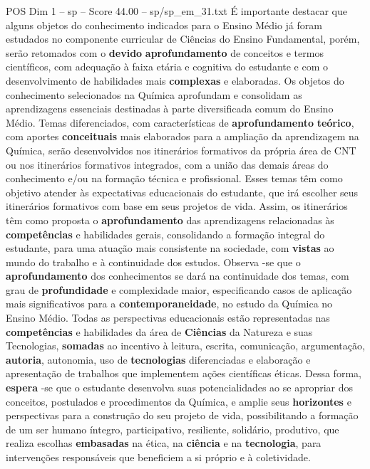 \begin{textsample}{POS Dim 1 – sp – Score 44.00 – sp/sp\_em\_31.txt}
É importante destacar que alguns objetos do conhecimento indicados para o Ensino Médio já foram estudados no componente curricular de Ciências do Ensino Fundamental, porém, serão retomados com o \textbf{devido} \textbf{aprofundamento} de conceitos e termos científicos, com adequação à faixa etária e cognitiva do estudante e com o desenvolvimento de habilidades mais \textbf{complexas} e elaboradas.
Os objetos do conhecimento selecionados na Química aprofundam e consolidam as aprendizagens essenciais destinadas à parte diversificada comum do Ensino Médio.
Temas diferenciados, com características de \textbf{aprofundamento} \textbf{teórico}, com aportes \textbf{conceituais} mais elaborados para a ampliação da aprendizagem na Química, serão desenvolvidos nos itinerários formativos da própria área de CNT ou nos itinerários formativos integrados, com a união das demais áreas do conhecimento e/ou na formação técnica e profissional.
Esses temas têm como objetivo atender às expectativas educacionais do estudante, que irá escolher seus itinerários formativos com base em seus projetos de vida.
Assim, os itinerários têm como proposta o \textbf{aprofundamento} das aprendizagens relacionadas às \textbf{competências} e habilidades gerais, consolidando a formação integral do estudante, para uma atuação mais consistente na sociedade, com \textbf{vistas} ao mundo do trabalho e à continuidade dos estudos.
Observa -se que o \textbf{aprofundamento} dos conhecimentos se dará na continuidade dos temas, com grau de \textbf{profundidade} e complexidade maior, especificando casos de aplicação mais significativos para a \textbf{contemporaneidade}, no estudo da Química no Ensino Médio.
Todas as perspectivas educacionais estão representadas nas \textbf{competências} e habilidades da área de \textbf{Ciências} da Natureza e suas Tecnologias, \textbf{somadas} ao incentivo à leitura, escrita, comunicação, argumentação, \textbf{autoria}, autonomia, uso de \textbf{tecnologias} diferenciadas e elaboração e apresentação de trabalhos que implementem ações científicas éticas.
Dessa forma, \textbf{espera} -se que o estudante desenvolva suas potencialidades ao se apropriar dos conceitos, postulados e procedimentos da Química, e amplie seus \textbf{horizontes} e perspectivas para a construção do seu projeto de vida, possibilitando a formação de um ser humano íntegro, participativo, resiliente, solidário, produtivo, que realiza escolhas \textbf{embasadas} na ética, na \textbf{ciência} e na \textbf{tecnologia}, para intervenções responsáveis que beneficiem a si próprio e à coletividade.

\end{textsample}
